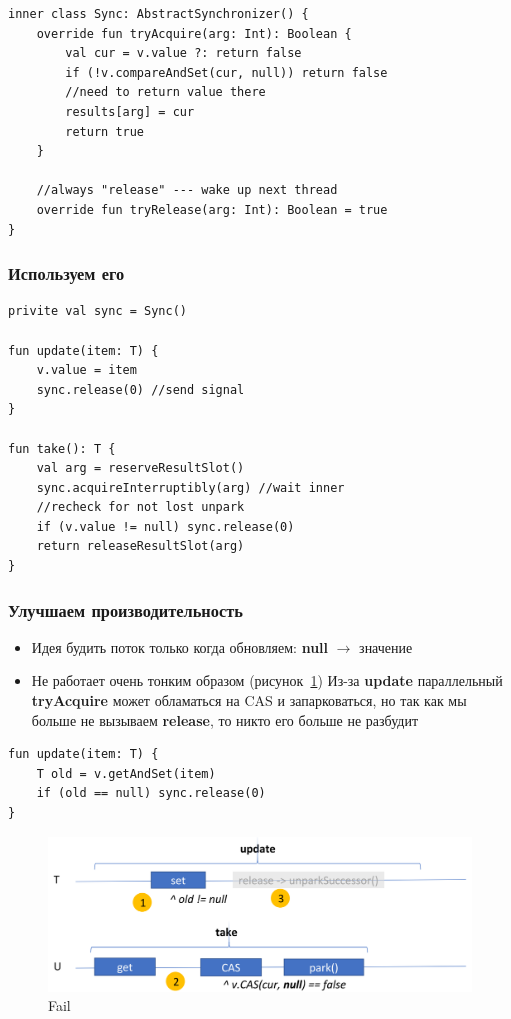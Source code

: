 \documentclass[10pt,a4paper,oneside,titlepage]{article}
\theoremstyle{plain}
\theoremstyle{defenition}
\begin{document}
\begin{lstlisting}
inner class Sync: AbstractSynchronizer() {
    override fun tryAcquire(arg: Int): Boolean {
        val cur = v.value ?: return false
        if (!v.compareAndSet(cur, null)) return false
        //need to return value there
        results[arg] = cur
        return true
    }
    
    //always "release" --- wake up next thread
    override fun tryRelease(arg: Int): Boolean = true
}
\end{lstlisting}

\subsubsection{Используем его}

\begin{lstlisting}
privite val sync = Sync()

fun update(item: T) {
    v.value = item
    sync.release(0) //send signal
}

fun take(): T {
    val arg = reserveResultSlot()
    sync.acquireInterruptibly(arg) //wait inner
    //recheck for not lost unpark
    if (v.value != null) sync.release(0)
    return releaseResultSlot(arg)
}
\end{lstlisting}

\subsubsection{Улучшаем производительность}

\begin{itemize}
	\item Идея будить поток только когда обновляем: {\bfseries null} $\to$ значение
	\item Не работает очень тонким образом (рисунок~\ref{fig:fail})
	\subitem Из-за {\bfseries update} параллельный {\bfseries tryAcquire} может обламаться на CAS и запарковаться, но так как мы больше не вызываем {\bfseries release}, то никто его больше не разбудит
\end{itemize}

\begin{lstlisting}
fun update(item: T) {
    T old = v.getAndSet(item)
    if (old == null) sync.release(0)
}
\end{lstlisting}

\begin{figure}[h!]
	\centering
	\includegraphics[width=0.4\linewidth]{pictures/Fail}
	\caption{Fail}
	\label{fig:fail}
\end{figure}
\end{document}
